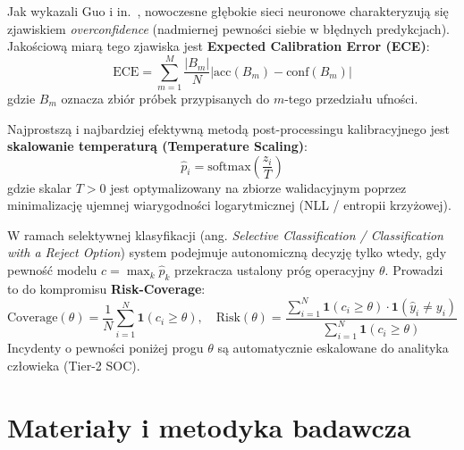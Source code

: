\documentclass[12pt,a4paper,twoside]{report}
\begin{document}
Jak wykazali Guo i in.~\cite{guo2017}, nowoczesne głębokie sieci neuronowe charakteryzują się zjawiskiem \emph{overconfidence} (nadmiernej pewności siebie w błędnych predykcjach). Jakościową miarą tego zjawiska jest \textbf{Expected Calibration Error (ECE)}:
\begin{equation}
  \mathrm{ECE} = \sum_{m=1}^M \frac{|B_m|}{N} \left| \mathrm{acc}(B_m) - \mathrm{conf}(B_m) \right|
\end{equation}
gdzie $B_m$ oznacza zbiór próbek przypisanych do $m$-tego przedziału ufności.

Najprostszą i najbardziej efektywną metodą post-processingu kalibracyjnego jest \textbf{skalowanie temperaturą (Temperature Scaling)}:
\begin{equation}
  \hat{p}_i = \mathrm{softmax}\left(\frac{z_i}{T}\right)
\end{equation}
gdzie skalar $T > 0$ jest optymalizowany na zbiorze walidacyjnym poprzez minimalizację ujemnej wiarygodności logarytmicznej (NLL / entropii krzyżowej).

W ramach selektywnej klasyfikacji (ang. \emph{Selective Classification / Classification with a Reject Option}) system podejmuje autonomiczną decyzję tylko wtedy, gdy pewność modelu $c = \max_k \hat{p}_k$ przekracza ustalony próg operacyjny $\theta$. Prowadzi to do kompromisu \textbf{Risk-Coverage}:
\begin{equation}
  \mathrm{Coverage}(\theta) = \frac{1}{N} \sum_{i=1}^N \mathbf{1}(c_i \ge \theta), \quad \mathrm{Risk}(\theta) = \frac{\sum_{i=1}^N \mathbf{1}(c_i \ge \theta) \cdot \mathbf{1}(\hat{y}_i \neq y_i)}{\sum_{i=1}^N \mathbf{1}(c_i \ge \theta)}
\end{equation}
Incydenty o pewności poniżej progu $\theta$ są automatycznie eskalowane do analityka człowieka (Tier-2 SOC).

\chapter{Materiały i metodyka badawcza}\label{ch:method}
\end{document}
